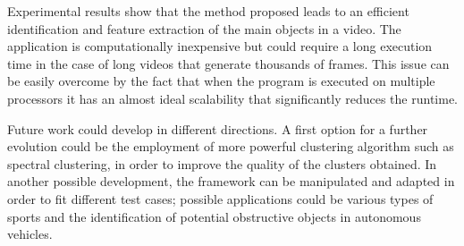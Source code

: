 \documentclass{usiinftr}
\begin{document}
Experimental results show that the method proposed leads to an efficient identification and feature extraction of the main objects in a video. The application is computationally inexpensive but could require a long execution time in the case of long videos that generate thousands of frames. This issue can be easily overcome by the fact that when the program is executed on multiple processors it has an almost ideal scalability that significantly reduces the runtime.

Future work could develop in different directions. A first option for a further evolution could be the employment of more powerful clustering algorithm such as spectral clustering, in order to improve the quality of the clusters obtained. In another possible development, the framework can be manipulated and adapted in order to fit different test cases; possible applications could be various types of sports and the identification of potential obstructive objects in autonomous vehicles.

  
\end{document}
